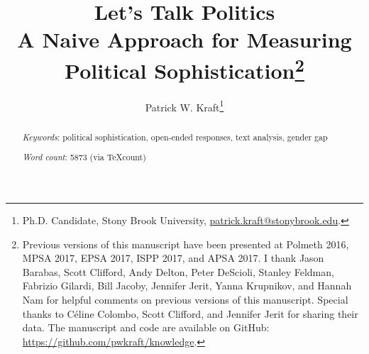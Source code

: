 \documentclass[12pt]{article}
\author{Patrick W. Kraft\footnote{Ph.D. Candidate, Stony Brook University, \href{mailto:patrick.kraft@stonybrook.edu}{patrick.kraft@stonybrook.edu}.
}}
\title{Let's Talk Politics\\
\large{A Naive Approach for Measuring Political Sophistication}\footnote{Previous versions of this manuscript have been presented at Polmeth 2016, MPSA 2017, EPSA 2017, ISPP 2017, and APSA 2017. I thank Jason Barabas, Scott Clifford, Andy Delton, Peter DeScioli, Stanley Feldman, Fabrizio Gilardi, Bill Jacoby, Jennifer Jerit, Yanna Krupnikov, and Hannah Nam for helpful comments on previous versions of this manuscript. Special thanks to C{\'e}line Colombo, Scott Clifford, and Jennifer Jerit for sharing their data. The manuscript and code are available on GitHub: \url{https://github.com/pwkraft/knowledge}.
}
}
\date{}
\begin{document}
\maketitle
\doublespacing
\thispagestyle{empty}


\hfill
\begin{abstract}\singlespacing
\noindent 


\vspace{\baselineskip}
\noindent \textit{Keywords}: political sophistication, open-ended responses, text analysis, gender gap

\vspace{\baselineskip}
\noindent \textit{Word count}: 5873 (via TeXcount)
\end{abstract}
\hfill

\newpage\setcounter{page}{1}


\clearpage
\singlespacing


\end{document}
